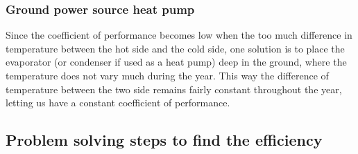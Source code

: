 \documentclass[10pt, twocolumn]{article}
\begin{document}
\subsubsection{Ground power source heat pump}
Since the coefficient of performance becomes low when the too much difference in temperature between the hot side and the cold side, one solution is to place the evaporator (or condenser if used as a heat pump) deep in the ground, where the temperature does not vary much during the year.
This way the difference of temperature between the two side remains fairly constant throughout the year, letting us have a constant coefficient of performance.


\subsection{Problem solving steps to find the efficiency}
\end{document}
